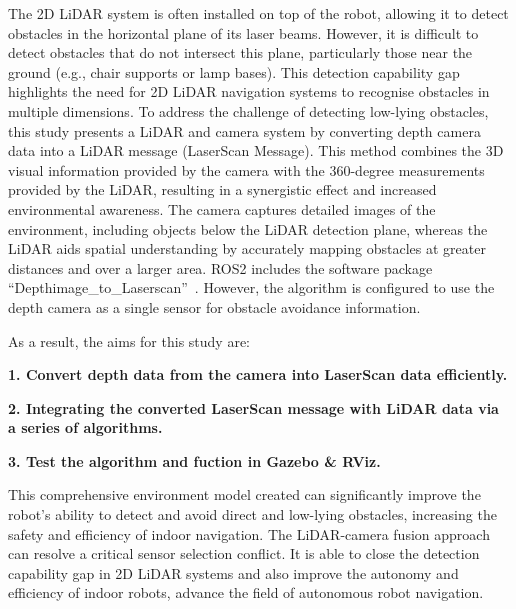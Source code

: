 The 2D LiDAR system is often installed on top of the robot, 
allowing it to detect obstacles in the horizontal plane of its laser beams. 
However, it is difficult to detect obstacles that do not intersect this plane, 
particularly those near the ground (e.g., chair supports or lamp bases). 
This detection capability gap highlights the need for 2D LiDAR navigation systems to recognise obstacles in multiple dimensions. 
To address the challenge of detecting low-lying obstacles, 
this study presents a LiDAR and camera system by converting depth camera data into a LiDAR message (LaserScan Message). 
This method combines the 3D visual information provided by the camera with the 360-degree measurements provided by the LiDAR, 
resulting in a synergistic effect and increased environmental awareness. 
The camera captures detailed images of the environment, 
including objects below the LiDAR detection plane, 
whereas the LiDAR aids spatial understanding by accurately mapping obstacles at greater distances and over a larger area.
ROS2 includes the software package ``Depthimage\_to\_Laserscan''~\cite{rosdepthimage}. 
However, the algorithm is configured to use the depth camera as a single sensor for obstacle avoidance information.

As a result, the aims for this study are: 

\textbf{1. Convert depth data from the camera into LaserScan data efficiently. }

\textbf{2. Integrating the converted LaserScan message with LiDAR data via a series of algorithms. }

\textbf{3. Test the algorithm and fuction in Gazebo \& RViz.}

This comprehensive environment model created can significantly improve the robot's ability to detect and avoid direct 
and low-lying obstacles, increasing the safety and efficiency of indoor navigation.
The LiDAR-camera fusion approach can resolve a critical sensor selection conflict.
It is able to close the detection capability gap in 2D LiDAR systems and also improve the autonomy and efficiency of indoor robots, 
advance the field of autonomous robot navigation.